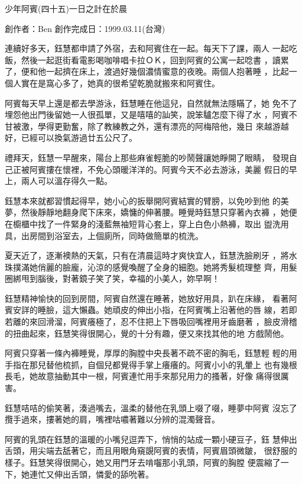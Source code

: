 



少年阿賓(四十五)一日之計在於晨

創作者：Ben
創作完成日：1999.03.11(台灣)


連續好多天，鈺慧都申請了外宿，去和阿賓住在一起。每天下了課，兩人
一起吃飯，然後一起逛街看電影喝咖啡唱卡拉ＯＫ，回到阿賓的公寓一起唸書
，讀累了，便和他一起擠在床上，渡過好幾個濃情蜜意的夜晚。兩個人抱著睡
，比起一個人實在是窩心多了，她真的很希望乾脆就搬來和阿賓住。

阿賓每天早上還是都去學游泳，鈺慧睡在他這兒，自然就無法隱瞞了，她
免不了埋怨他出門後留她一人很孤單，又是嘻嘻的訕笑，說笨驢怎麼下得了水
，阿賓不甘被激，學得更勤奮，除了教練教之外，還有漂亮的阿梅陪他，幾日
來越游越好，已經可以換氣游過廿五公尺了。

禮拜天，鈺慧一早醒來，陽台上那些麻雀輕脆的吵鬧聲讓她睜開了眼睛，
發現自己正被阿賓摟在懷裡，不免心頭暖洋洋的。阿賓今天不必去游泳，美麗
假日的早上，兩人可以溫存得久一點。

鈺慧本來就都習慣起得早，她小心的扳舉開阿賓結實的臂膀，以免吵到他
的美夢，然後靜靜地翻身爬下床來，嬌慵的伸著腰。睡覺時鈺慧只穿著內衣褲
，她便在櫥櫃中找了一件緊身的淺藍無袖短背心套上，穿上白色小熱褲，取出
盥洗用具，出房間到浴室去，上個廁所，同時做簡單的梳洗。

夏天近了，逐漸襖熱的天氣，只有在清晨這時才爽快宜人，鈺慧洗臉刷牙
，將水珠撲滿她俏麗的臉龐，沁涼的感覺喚醒了全身的細胞。她將秀髮梳理整
齊，用髮圈綁甩到腦後，對著鏡子笑了笑，幸福的小美人，妳早啊！

鈺慧精神愉快的回到房間，阿賓自然還在睡著，她放好用具，趴在床緣，
看著阿賓安詳的睡臉，這大懶蟲。她頑皮的伸出小指，在阿賓嘴上沿著他的唇
線，若即若離的來回滑溜，阿賓癢極了，忍不住把上下唇吸回嘴裡用牙齒磨著
，臉皮滑稽的扭曲起來，鈺慧笑得很開心，覺的十分有趣，便又來找其他的地
方戲鬧他。

阿賓只穿著一條內褲睡覺，厚厚的胸膛中央長著不疏不密的胸毛，鈺慧輕
輕的用手指在那兒替他梳抓，自個兒都覺得手掌上癢癢的。阿賓小小的乳暈上
也有幾根長毛，她故意抽動其中一根，阿賓連忙用手來那兒用力的搔著，好像
痛得很厲害。

鈺慧咭咭的偷笑著，湊過嘴去，溫柔的替他在乳頭上啜了啜，睡夢中阿賓
沒忘了攬手過來，摟著她的肩，嘴裡咕噥著難以分辨的混濁聲音。

阿賓的乳頭在鈺慧的溫暖的小嘴兒逗弄下，悄悄的站成一顆小硬豆子，鈺
慧伸出舌頭，用尖端去舐著它，而且用眼角窺覬阿賓的表情，阿賓眉頭微皺，
很舒服的樣子。鈺慧笑得很開心，她又用門牙去啃囓那小乳頭，阿賓的胸膛
便震縮了一下，她連忙又伸出舌頭，憐愛的舔吮著。

